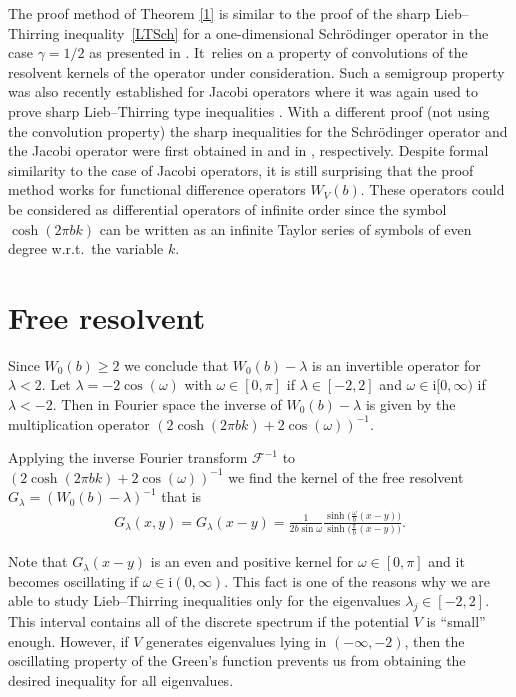 \documentclass[11pt]{article}
\numberwithin{equation}{section}
\numberwithin{equation}{section}
\newcommand{\ii}{\mathrm{i}}
\begin{document}
The proof method of Theorem \ref{1} is similar to the proof of the sharp Lieb--Thirring inequa\-lity~\eqref{LTSch} for a one-dimensional Schr\"odinger operator in the case $\gamma=1/2$ as presented in \cite{HLW}. It~relies on a property of convolutions of the resolvent kernels of the operator under consideration. Such a semigroup property was also recently established for Jacobi operators where it was again used to prove sharp Lieb--Thirring type inequalities \cite{LLS}. With a different proof (not using the convolution property) the sharp inequalities for the Schr\"odinger operator and the Jacobi operator were first obtained in \cite{HLT} and in \cite{HS}, respectively. Despite formal similarity to the case of Jacobi operators, it is still surprising that the proof method works for functional difference operators $W_V(b)$. These operators could be considered as differential operators of infinite order since the symbol $\cosh(2\pi b k)$ can be written as an infinite Taylor series of symbols of even degree w.r.t.\ the variable $k$.

\section{Free resolvent}

Since $W_0(b)\ge 2$ we conclude that $W_0(b)-\lambda$ is an invertible operator for $\lambda<2$. Let
$\lambda=-2\cos(\omega)$ with $\omega\in[0,\pi]$ if $\lambda\in[-2,2]$ and $\omega\in\ii[0,\infty)$ if $\lambda<-2$. Then in Fourier space the inverse of $W_0(b)-\lambda$ is given by the multiplication operator $(2\cosh(2\pi b k)+2\cos(\omega))^{-1}$.

Applying the inverse Fourier transform $\mathcal{F}^{-1}$ to $(2\cosh(2\pi b k)+2\cos(\omega))^{-1}$ we find the kernel of the free resolvent $G_\lambda=(W_0(b)-\lambda)^{-1}$ that is
\begin{gather}\label{rezolvent}
G_\lambda(x,y) = G_\lambda(x-y)=\frac{1}{2b\sin \omega} \frac{\sinh \big(\frac{\omega}{b} (x-y)\big)}{\sinh \big(\frac{\pi}{b} (x-y)\big)}.
\end{gather}

\begin{Remark}
Note that $G_\lambda(x-y)$ is an even and positive kernel for $\omega\in[0,\pi]$ and it becomes oscillating if
$\omega\in \ii(0,\infty)$.
This fact is one of the reasons why we are able to study Lieb--Thirring inequalities only for the eigenvalues $\lambda_j \in [-2,2]$. This interval contains all of the discrete spectrum if the potential $V$ is ``small'' enough. However, if $V$ generates eigenvalues lying in $(-\infty,-2)$, then the oscillating property of the Green's function prevents us from obtaining the desired inequality for all eigenvalues.
\end{Remark}
\end{document}
